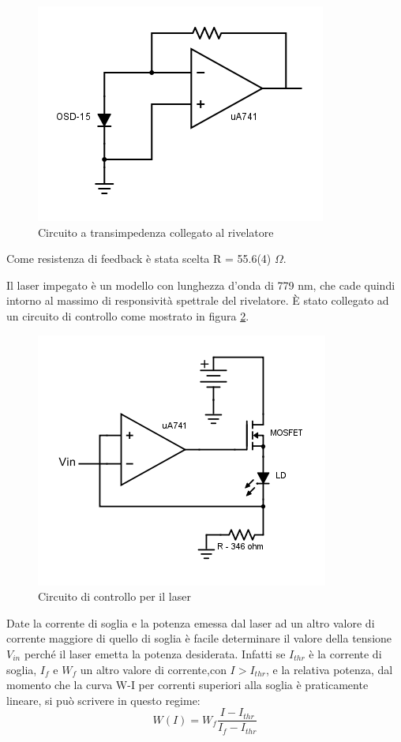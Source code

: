 \documentclass[10pt,letterpaper]{article}
\begin{document}
\begin{figure}[htp]
\centering
\includegraphics[scale=.45]{transimpedance}
\caption{Circuito a transimpedenza collegato al rivelatore}
\label{fig:trans}
\end{figure}

Come resistenza di feedback è stata scelta R = 55.6(4) $\Omega$.

Il laser impegato è un modello %
con lunghezza d'onda di 779 nm, che cade quindi intorno al massimo di responsività spettrale del rivelatore. È stato collegato ad un circuito di controllo
come mostrato in figura \ref{fig:laser}.

\begin{figure}[htp]
\centering
\includegraphics[scale=.5]{laser}
\caption{Circuito di controllo per il laser}
\label{fig:laser}
\end{figure} 

Date la corrente di soglia e la potenza emessa dal laser ad un altro valore di corrente maggiore di quello di soglia è facile determinare il valore della tensione $V_{in}$ perché il laser emetta la potenza desiderata. Infatti se $I_{thr}$ è la corrente di soglia, $I_f$ e $W_f$ un altro valore di corrente,con $I>I_{thr}$, e la relativa potenza, dal momento che la curva W-I per correnti superiori alla soglia è praticamente lineare, si può scrivere in questo regime:
\begin{equation}
W(I) = W_f \frac{I-I_{thr}}{I_f - I_{thr}}
\end{equation}
\end{document}
